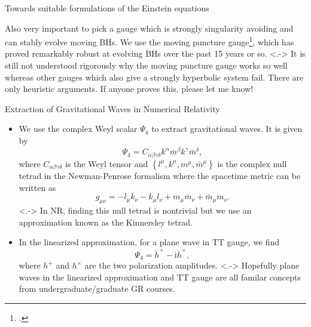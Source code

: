 \documentclass[smaller,aspectratio=169]{beamer}
\begin{document}
\begin{frame}{Towards suitable formulations of the Einstein equations}
\begin{itemize}
        Also very important to pick a gauge which is strongly 
        singularity avoiding and can stably evolve moving BHs. We use the 
        moving puncture 
        gauge\footcite{Baker:2005vv,Campanelli:2005dd,Alcubierre:2002kk,
        Bona:1994dr}, which has proved remarkably robust at evolving BHs over 
        the past 15 years or so.
    \note[item]<.->{
        It is still not understood rigorously why the moving puncture 
        gauge works so well whereas other gauges which also give a strongly 
        hyperbolic system fail. There are only heuristic arguments. If anyone 
        proves this, please let me know!}
    \end{itemize}
    \vspace{0.5 em}
\end{frame}

\begin{frame}{Extraction of Gravitational Waves in Numerical Relativity}
    \begin{itemize}
    \item<+->
        We use the complex \alert{Weyl scalar} $\Psi_4$ to extract 
        gravitational waves. It is given by
        \begin{equation}
            \Psi_4 = C_{\alpha\beta\gamma\delta}k^\alpha \bar{m}^\beta k^\gamma 
            \bar{m}^\delta,
        \end{equation}
        where $C_{\alpha\beta\gamma\delta}$ is the Weyl tensor and 
        $\left\{l^\mu,k^\mu,m^\mu,\bar{m}^\mu\right\}$ is the complex null 
        tetrad in the \alert{Newman-Penrose formalism} 
        where the spacetime metric can be written as
        \begin{equation}
            g_{\mu\nu} = -l_\mu k_\nu -k_\mu l_\nu + m_\mu \bar{m}_\nu + 
            \bar{m}_\mu m_\nu.
        \end{equation}
    \note[item]<.->{
        In NR, finding this null tetrad is nontrivial but we use an 
        approximation known as the Kinnersley tetrad.}
    \item<+->
        In the \alert{linearized approximation}, for a plane wave in TT gauge, 
        we find
        \begin{equation}
        \Psi_4 = \ddot{h}^+-\mathrm{i}\ddot{h}^\times,
        \end{equation}
        where $h^+$ and $h^\times$ are the two polarization amplitudes.
    \note[item]<.->{
        Hopefully plane waves in the linearized approximation and TT gauge
        are all familar concepts from undergraduate/graduate GR courses.}

\end{itemize}
\end{frame}
\end{document}
